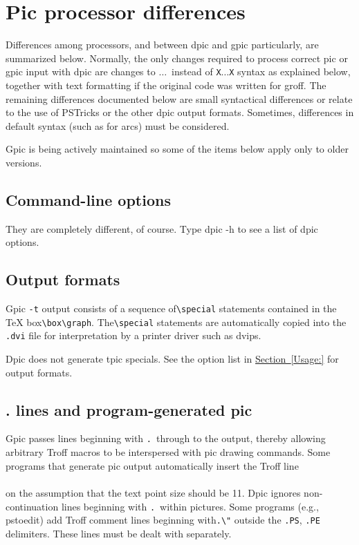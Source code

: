 \documentclass[11pt]{article}
\newcommand{\bq}{}
\newcommand{\groff}{{\bq groff}\xspace}
\newcommand{\PSTricks}{{\bq PSTricks}\xspace}
\newcommand{\ntt}[1]{\\\hbox{}\quad{\tt #1}}
\newcommand{\tLB}{{\tt\char123}}
\newcommand{\tRB}{{\tt\char125}}
\newcommand{\SR}[1]{\hyperref[#1]{Section~\ref*{#1}}}
\begin{document}
\section{Pic processor differences}\label{Diffs:}
Differences among processors, and between dpic and gpic particularly,
are summarized below.  Normally, the
only changes required to process correct pic or gpic input with dpic are
changes to \tLB$\ldots$\tRB\ instead of {\tt X}$\ldots${\tt X}
syntax as explained below, together with text formatting
if the original code was written for \groff.  The remaining
differences documented below are small syntactical differences or
relate to the use of \PSTricks or the other dpic output formats.
Sometimes, differences in default syntax (such as for arcs) must be
considered.

Gpic is being actively maintained so some of the items below apply only
to older versions.

\subsection{Command-line options}  They are completely different, of course.
  Type dpic -h to see a list of dpic options.

\subsection{Output formats}
  Gpic {\tt-t} output consists of a sequence of\verb|\special| statements
  contained in the TeX box\verb|\box\graph|.  The\verb|\special| statements
  are
  automatically copied into the {\tt.dvi} file for interpretation by a
  printer driver such as dvips.

  Dpic does not generate tpic specials.
  See the option list in \SR{Usage:} for output formats.

\subsection{. lines and program-generated pic}
  Gpic passes lines beginning with {\tt.}\ through to the output,
  thereby allowing
  arbitrary Troff macros to be interspersed with pic drawing commands.  Some
  programs that generate pic output automatically insert the Troff line
  \ntt{.ps 11}\\
  on the assumption that the text point size should be 11.  Dpic ignores
  non-continuation lines beginning with {\tt.}\ within pictures.
  Some programs (e.g., pstoedit) add Troff
  comment lines beginning with\verb|.\"| outside the
  {\tt.PS}, {\tt.PE} delimiters.  These
  lines must be dealt with separately.
\end{document}
